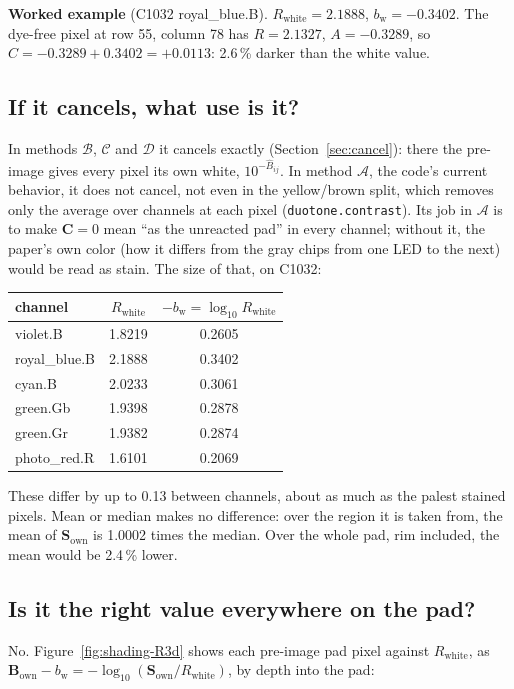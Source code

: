 \documentclass[11pt,letterpaper]{article}
\newcommand{\code}[1]{\texttt{#1}}
\newcommand{\mC}{\mathbf{C}}   %
\newcommand{\Sown}{\mathbf{S}_{\text{own}}}
\newcommand{\Bown}{\mathbf{B}_{\text{own}}}
\newcommand{\Rwhite}{R_{\text{white}}}
\newcommand{\bw}{b_{\text{w}}}
\newcommand{\MA}{\mathcal{A}}
\newcommand{\MB}{\mathcal{B}}
\newcommand{\MC}{\mathcal{C}}
\newcommand{\MD}{\mathcal{D}}
\begin{document}
\noindent\textbf{Worked example} (C1032 royal\_blue.B).  $\Rwhite = 2.1888$,
$\bw = -0.3402$.  The dye-free pixel at row 55, column 78 has
$R = 2.1327$, $A = -0.3289$, so $C = -0.3289 + 0.3402 = +0.0113$: 2.6\,\%
darker than the white value.

\subsection{If it cancels, what use is it?}

In methods $\MB$, $\MC$ and $\MD$ it cancels exactly
(Section~\ref{sec:cancel}): there the pre-image gives every pixel its own
white, $10^{-\hat B_{ij}}$.  In method $\MA$, the code's current behavior,
it does not cancel, not even in the yellow/brown split, which removes only
the average over channels at each pixel (\code{duotone.contrast}).  Its job
in $\MA$ is to make $\mC = 0$ mean ``as the unreacted pad'' in every
channel; without it, the paper's own color (how it differs from the gray
chips from one LED to the next) would be read as stain.  The size of that,
on C1032:

\medskip
\begin{center}
\begin{tabular}{@{}lcc@{}}
\toprule
channel & $\Rwhite$ & $-\bw = \log_{10}\Rwhite$ \\
\midrule
violet.B      & 1.8219 & 0.2605 \\
royal\_blue.B & 2.1888 & 0.3402 \\
cyan.B        & 2.0233 & 0.3061 \\
green.Gb      & 1.9398 & 0.2878 \\
green.Gr      & 1.9382 & 0.2874 \\
photo\_red.R  & 1.6101 & 0.2069 \\
\bottomrule
\end{tabular}
\end{center}

\noindent These differ by up to 0.13 between channels, about as much as the
palest stained pixels.  Mean or median makes no difference: over the region
it is taken from, the mean of $\Sown$ is 1.0002 times the median.  Over the
whole pad, rim included, the mean would be 2.4\,\% lower.

\subsection{Is it the right value everywhere on the pad?}

No.  Figure~\ref{fig:shading-R3d} shows each pre-image pad pixel against
$\Rwhite$, as $\Bown - \bw = -\log_{10}(\Sown/\Rwhite)$, by depth into the
pad:
\end{document}
